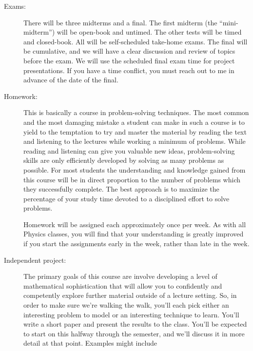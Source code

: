 \documentclass[12pt]{article}
\begin{document}
{\begin{description}
  \item[Exams:] There will be three midterms and a final. The first
        midterm (the ``mini-midterm'') will be open-book and
        untimed. The other tests will be timed and closed-book. All
        will be self-scheduled take-home exams. The final will be
        cumulative, and we will have a clear discussion and review of topics before
        the exam. We will use the scheduled final exam time for
        project presentations.
        If you have a time conflict, you must reach out to me in
        advance of the date of the final.

  \item[Homework:] This is basically a course in
        problem-solving techniques.  The most common and the most damaging
        mistake a student can make in such a course is to yield to the
        temptation to try and master the material by reading the text and
        listening to the lectures while working a minimum of problems.  While
        reading and listening can give you valuable new ideas, problem-solving
        skills are only efficiently developed by solving as many problems as
        possible.  For most students the understanding and knowledge gained
        from this course will be in direct proportion to the number of
        problems which they successfully complete.  The best approach is to
        maximize the percentage of your study time devoted to a disciplined
        effort to solve problems.
        
        Homework will be assigned each approximately once per week. As with
        all Physics classes, you will find that your understanding is greatly
        improved if you start the assignments early in the week, rather than
        late in the week.
        
        \newpage
  \item[Independent project:] The primary goals of this course are
        involve developing a level of mathematical sophistication that
        will allow you to confidently and competently explore further
        material outside of a lecture setting. So, in order to make
        sure we're walking the walk, you'll each pick either an
        interesting problem to model or an interesting technique to
        learn. You'll write a short paper and present the results to
        the class. You'll be expected to start on this halfway through
        the semester, and we'll discuss it in more detail at that
        point. Examples might include 


\end{description}}
\end{document}
